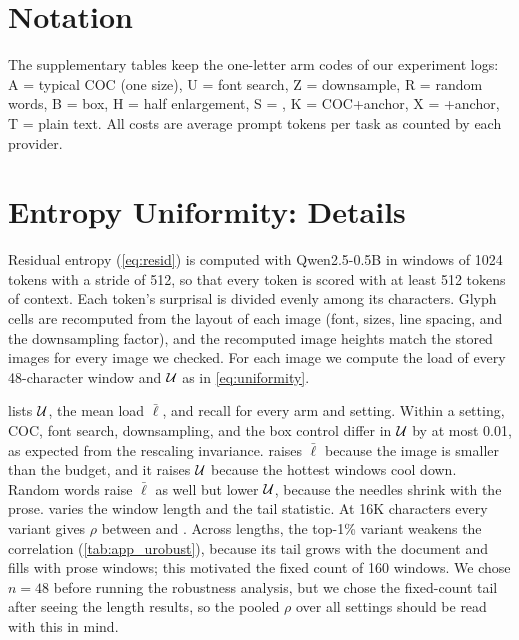 \renewcommand{\topfraction}{0.9}\renewcommand{\bottomfraction}{0.8}\renewcommand{\textfraction}{0.07}
\renewcommand{\floatpagefraction}{0.75}\renewcommand{\dbltopfraction}{0.9}\renewcommand{\dblfloatpagefraction}{0.75}
\setcounter{topnumber}{3}\setcounter{bottomnumber}{2}\setcounter{totalnumber}{5}\setcounter{dbltopnumber}{3}
\section*{Notation}
The supplementary tables keep the one-letter arm codes of our experiment logs:
A = typical COC (one size),
U = font search,
Z = downsample,
R = random words,
B = box,
H = half enlargement,
S = \name,
K = COC+anchor,
X = \name+anchor,
T = plain text.
All costs are average prompt tokens per task as counted by each provider.

\section{Entropy Uniformity: Details}
\label{app:uniformity}

Residual entropy (\cref{eq:resid}) is computed with Qwen2.5-0.5B in windows of 1024 tokens with a stride of 512, so that every token is scored with at least 512 tokens of context.
Each token's surprisal is divided evenly among its characters.
Glyph cells are recomputed from the layout of each image (font, sizes, line spacing, and the downsampling factor), and the recomputed image heights match the stored images for every image we checked.
For each image we compute the load of every 48-character window and $\mathcal{U}$ as in \cref{eq:uniformity}.

 lists $\mathcal{U}$, the mean load $\bar\ell$, and recall for every arm and setting.
Within a setting, COC, font search, downsampling, and the box control differ in $\mathcal{U}$ by at most 0.01, as expected from the rescaling invariance.
\name raises $\bar\ell$ because the image is smaller than the budget, and it raises $\mathcal{U}$ because the hottest windows cool down.
Random words raise $\bar\ell$ as well but lower $\mathcal{U}$, because the needles shrink with the prose.
 varies the window length and the tail statistic.
At 16K characters every variant gives $\rho$ between \UrhoMin{} and \UrhoMax{}.
Across lengths, the top-1\% variant weakens the correlation (\cref{tab:app_urobust}), because its tail grows with the document and fills with prose windows; this motivated the fixed count of 160 windows.
We chose $n=48$ before running the robustness analysis, but we chose the fixed-count tail after seeing the length results, so the pooled $\rho$ over all settings should be read with this in mind.

